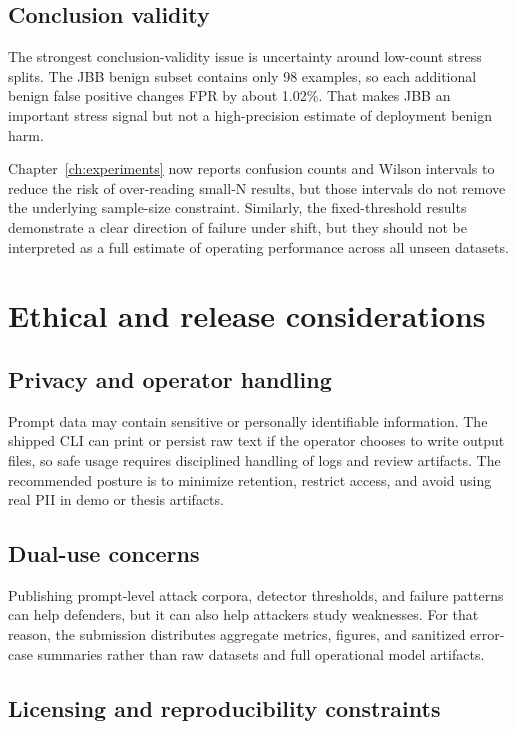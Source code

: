 \subsection{Conclusion validity}

The strongest conclusion-validity issue is uncertainty around low-count stress splits. The JBB benign subset contains only 98 examples, so each additional benign false positive changes FPR by about 1.02\%. That makes JBB an important stress signal but not a high-precision estimate of deployment benign harm.

Chapter~\ref{ch:experiments} now reports confusion counts and Wilson intervals to reduce the risk of over-reading small-N results, but those intervals do not remove the underlying sample-size constraint. Similarly, the fixed-threshold results demonstrate a clear direction of failure under shift, but they should not be interpreted as a full estimate of operating performance across all unseen datasets.

\section{Ethical and release considerations}

\subsection{Privacy and operator handling}

Prompt data may contain sensitive or personally identifiable information. The shipped CLI can print or persist raw text if the operator chooses to write output files, so safe usage requires disciplined handling of logs and review artifacts. The recommended posture is to minimize retention, restrict access, and avoid using real PII in demo or thesis artifacts.

\subsection{Dual-use concerns}

Publishing prompt-level attack corpora, detector thresholds, and failure patterns can help defenders, but it can also help attackers study weaknesses. For that reason, the submission distributes aggregate metrics, figures, and sanitized error-case summaries rather than raw datasets and full operational model artifacts.

\subsection{Licensing and reproducibility constraints}

